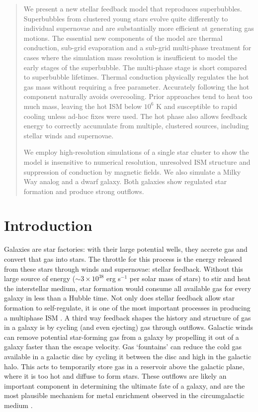 \begin{abstract}
We present a new stellar feedback model that reproduces superbubbles.
Superbubbles from clustered young stars evolve quite differently to individual
supernovae and are substantially more efficient at generating gas motions.  The
essential new components of the model are thermal conduction, sub-grid
evaporation and a sub-grid multi-phase treatment for cases where the simulation
mass resolution is insufficient to model the early stages of the superbubble.
The multi-phase stage is short compared to superbubble lifetimes.  Thermal
conduction physically regulates the hot gas mass without requiring a free
parameter.  Accurately following the hot component naturally avoids overcooling.
Prior approaches tend to heat too much mass, leaving the hot ISM below $10^6$ K
and susceptible to rapid cooling unless ad-hoc fixes were used.  The hot
phase also allows feedback energy to correctly accumulate from multiple,
clustered sources, including stellar winds and supernovae.

We employ high-resolution simulations of a single star cluster to show the model
is insensitive to numerical resolution, unresolved ISM structure and suppression
of conduction by magnetic fields.  We also simulate a Milky Way analog and a
dwarf galaxy.  Both galaxies show regulated star formation and produce 
strong outflows.
\end{abstract}

\section{Introduction}
Galaxies are star factories:  with their large potential wells, they accrete gas
and convert that gas into stars.  The throttle for this process
is the energy released from these stars through winds and supernovae: stellar
feedback.  Without this large source of energy ($\sim 3\times 10^{38}$ erg
s$^{-1}$ per solar mass of stars) to stir and heat the interstellar medium, star
formation would consume all available gas for every galaxy in less than a Hubble
time.  Not only does stellar feedback allow star formation to self-regulate, it
is one of the most important processes in producing a multiphase ISM
\citep{McKee1977}.  A third way feedback shapes the history and structure of gas
in a galaxy is by cycling (and even ejecting) gas through outflows.  Galactic
winds can remove potential star-forming gas from a galaxy by propelling it out
of a galaxy faster than the escape velocity.  Gas `fountains' can reduce the
cold gas available in a galactic disc by cycling it between the disc and high in
the galactic halo. This acts to temporarily store gas in a reservoir above the
galactic plane, where it is too hot and diffuse to form stars.  These outflows
are likely an important component in determining the ultimate fate of a galaxy,
and are the most plausible mechanism for metal enrichment observed in the
circumgalactic medium \citep{Songaila1996,Dave1998}.

